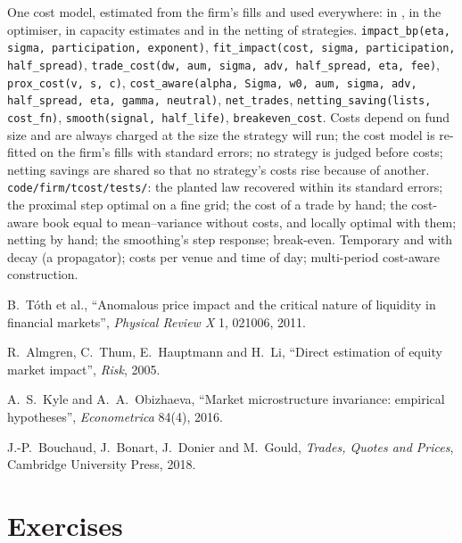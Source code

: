 \begin{build}
 One cost model, estimated from the firm's fills and used everywhere: in , in the optimiser, in capacity estimates and in the netting of
strategies.
 \texttt{impact\_bp(eta, sigma, participation, exponent)}, \texttt{fit\_impact(cost, sigma, participation, half\_spread)},
\texttt{trade\_cost(dw, aum, sigma, adv, half\_spread, eta, fee)}, \texttt{prox\_cost(v, s, c)}, \texttt{cost\_aware(alpha, Sigma, w0, aum, sigma, adv, half\_spread,
eta, gamma, neutral)}, \texttt{net\_trades}, \texttt{netting\_saving(lists, cost\_fn)}, \texttt{smooth(signal, half\_life)}, \texttt{breakeven\_cost}.
 Costs depend on fund size and are always charged at the size the strategy will run; the cost model is re-fitted on the firm's fills with standard
errors; no strategy is judged before costs; netting savings are shared so that no strategy's costs rise because of another.
 \texttt{code/firm/tcost/tests/}: the planted law recovered within its standard errors; the proximal step optimal on a fine grid; the cost of a
trade by hand; the cost-aware book equal to mean--variance without costs, and locally optimal with them; netting by hand; the smoothing's step response; break-even.
 Temporary and  with decay (a propagator); costs per venue and time of day; multi-period cost-aware construction.
\end{build}

\begin{omsources}
\item B.~Tóth et al., ``Anomalous price impact and the critical nature of liquidity in financial markets'', \emph{Physical Review X} 1, 021006, 2011.
\item R.~Almgren, C.~Thum, E.~Hauptmann and H.~Li, ``Direct estimation of equity market impact'', \emph{Risk}, 2005.
\item A.~S.~Kyle and A.~A.~Obizhaeva, ``Market microstructure invariance: empirical hypotheses'', \emph{Econometrica} 84(4), 2016.
\item J.-P.~Bouchaud, J.~Bonart, J.~Donier and M.~Gould, \emph{Trades, Quotes and Prices}, Cambridge University Press, 2018.
\end{omsources}

\section{Exercises}


